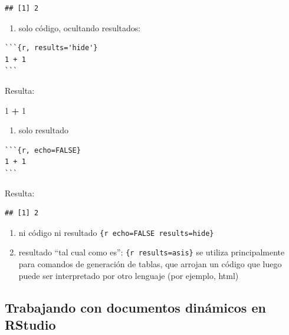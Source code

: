 \documentclass[
  11pt,
]{book}
\newenvironment{Shaded}{\begin{snugshade}}{\end{snugshade}}
\newcommand{\DecValTok}[1]{\textcolor[rgb]{0.00,0.00,0.81}{#1}}
\newcommand{\OperatorTok}[1]{\textcolor[rgb]{0.81,0.36,0.00}{\textbf{#1}}}
\newcommand{\StringTok}[1]{\textcolor[rgb]{0.31,0.60,0.02}{#1}}
\providecommand{\tightlist}{%
  \setlength{\itemsep}{0pt}\setlength{\parskip}{0pt}}
\begin{document}
\begin{verbatim}
## [1] 2
\end{verbatim}

\begin{enumerate}
\def\labelenumi{\arabic{enumi}.}
\setcounter{enumi}{1}
\tightlist
\item
  solo código, ocultando resultados:
\end{enumerate}

\begin{verbatim}
```{r, results='hide'}
1 + 1
```
\end{verbatim}

Resulta:

\begin{Shaded}
\begin{Highlighting}[]
\DecValTok{1} \OperatorTok{+}\StringTok{ }\DecValTok{1}
\end{Highlighting}
\end{Shaded}

\begin{enumerate}
\def\labelenumi{\arabic{enumi}.}
\setcounter{enumi}{2}
\tightlist
\item
  solo resultado
\end{enumerate}

\begin{verbatim}
```{r, echo=FALSE}
1 + 1
```
\end{verbatim}

Resulta:

\begin{verbatim}
## [1] 2
\end{verbatim}

\begin{enumerate}
\def\labelenumi{\arabic{enumi}.}
\setcounter{enumi}{3}
\tightlist
\item
  ni código ni resultado \texttt{\{r\ echo=FALSE\ results=\textquotesingle{}hide\textquotesingle{}\}}
\item
  resultado ``tal cual como es'': \texttt{\{r\ results=\textquotesingle{}asis\textquotesingle{}\}} se utiliza principalmente para comandos de generación de tablas, que arrojan un código que luego puede ser interpretado por otro lenguaje (por ejemplo, html)
\end{enumerate}

\hypertarget{trabajando-con-documentos-dinuxe1micos-en-rstudio}{%
\subsection{Trabajando con documentos dinámicos en RStudio}\label{trabajando-con-documentos-dinuxe1micos-en-rstudio}}
\end{document}
